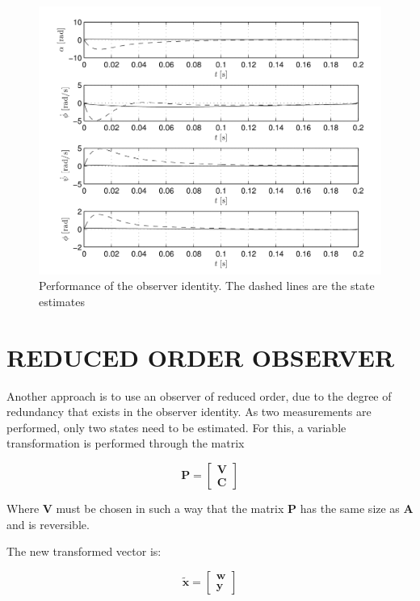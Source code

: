 \documentclass[sublist,a4paper,twoside,11pt]{article}
\begin{document}
\begin{figure}
	\centering
	\includegraphics[width=0.9\linewidth]{figures/ObserverIdentityPerformance}
	\caption{Performance of the observer identity. The dashed lines are the state estimates}
	\label{fig:observeridentityperformance}
\end{figure}


\section{REDUCED ORDER OBSERVER}
Another approach is to use an observer of reduced order, due to the degree of redundancy that exists in the observer identity. As two measurements are performed, only two states need to be estimated. For this, a variable transformation is performed through the matrix

\begin{equation}\mathbf{P=
\begin{bmatrix}
V\\
C
\end{bmatrix}}
\end{equation}

Where $\mathbf{V}$ must be chosen in such a way that the matrix $\mathbf{P}$ has the same size as $\mathbf{A}$ and is reversible.

The new transformed vector is:

\begin{equation}\mathbf{\tilde{x}=
	\begin{bmatrix}
	w\\
	y
	\end{bmatrix}}
\end{equation}
\end{document}

